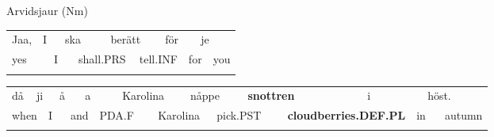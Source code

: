 \begin{listWWNumileveli}
\item {}

\begin{styleExample}
Arvidsjaur (Nm)

\end{styleExample}

\end{listWWNumileveli}

\begin{tabular}{llllllllllll}
\lsptoprule
Jaa, & \multicolumn{2}{l}{I

} & \multicolumn{2}{l}{ska

} & \multicolumn{2}{l}{berätt

} & \multicolumn{2}{l}{för

} & \multicolumn{2}{l}{je

} & \\
\multicolumn{2}{l}{yes

} & \multicolumn{2}{l}{I

} & \multicolumn{2}{l}{shall.PRS

} & \multicolumn{2}{l}{tell.INF

} & \multicolumn{2}{l}{for

} & \multicolumn{2}{l}{you

}\\
\lspbottomrule
\end{tabular}

\begin{tabular}{llllllllllllllllll}
\lsptoprule
då & \multicolumn{2}{l}{ji

} & \multicolumn{2}{l}{å

} & \multicolumn{2}{l}{a

} & \multicolumn{2}{l}{Karolina

} & \multicolumn{2}{l}{nåppe

} & \multicolumn{2}{l}{{\bfseries snottren}

} & \multicolumn{2}{l}{i

} & \multicolumn{2}{l}{höst.

} & \\
\multicolumn{2}{l}{when

} & \multicolumn{2}{l}{I

} & \multicolumn{2}{l}{and

} & \multicolumn{2}{l}{PDA.F

} & \multicolumn{2}{l}{Karolina

} & \multicolumn{2}{l}{pick.PST

} & \multicolumn{2}{l}{{\bfseries cloudberries.DEF.PL}

} & \multicolumn{2}{l}{in

} & \multicolumn{2}{l}{autumn

}\\
\lspbottomrule
\end{tabular}

